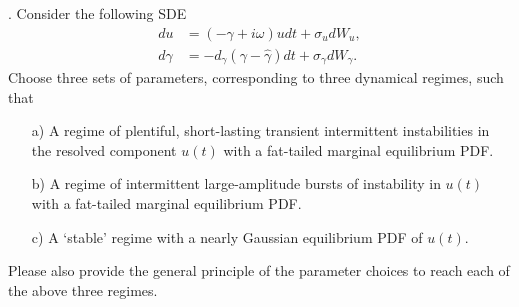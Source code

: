 \documentclass[a4paper,notitlepage,cs4size,cap,indent,oneside,12pt]{article}
\numberwithin{equation}{section}
\numberwithin{figure}{section}
\begin{document}
. Consider the following SDE
\begin{equation*}
\begin{split}
    d{u} &= (-{\gamma} + i{\omega}){u} dt + \sigma_u dW_u,\\
    d{\gamma} &= -d_\gamma ({\gamma}-\hat{\gamma}) dt + \sigma_\gamma dW_\gamma.
\end{split}
\end{equation*}
Choose three sets of parameters, corresponding to three dynamical regimes, such that
\begin{enumerate}
  \item [a)] A regime of plentiful, short-lasting transient intermittent instabilities in the resolved component $u(t)$ with a fat-tailed marginal equilibrium PDF.
  \item [b)] A regime of intermittent large-amplitude bursts of instability in $u(t)$ with a fat-tailed marginal equilibrium PDF.
  \item [c)] A `stable' regime with a nearly Gaussian equilibrium PDF of $u(t)$.
\end{enumerate}
Please also provide the general principle of the parameter choices to reach each of the above three regimes.\medskip\medskip
\end{document}

